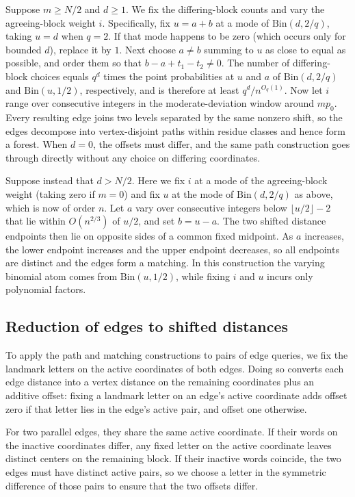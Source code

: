 Suppose $m\ge N/2$ and $d\ge1$. We fix the differing-block counts and vary the agreeing-block weight $i$. Specifically, fix $u=a+b$ at a mode of $\mathrm{Bin}(d,2/q)$, taking $u=d$ when $q=2$. If that mode happens to be zero (which occurs only for bounded $d$), replace it by $1$. Next choose $a\ne b$ summing to $u$ as close to equal as possible, and order them so that $b-a+t_1-t_2\ne0$. The number of differing-block choices equals $q^d$ times the point probabilities at $u$ and $a$ of $\mathrm{Bin}(d,2/q)$ and $\mathrm{Bin}(u,1/2)$, respectively, and is therefore at least $q^d/n^{O_q(1)}$. Now let $i$ range over consecutive integers in the moderate-deviation window around $mp_0$. Every resulting edge joins two levels separated by the same nonzero shift, so the edges decompose into vertex-disjoint paths within residue classes and hence form a forest. When $d=0$, the offsets must differ, and the same path construction goes through directly without any choice on differing coordinates.

Suppose instead that $d>N/2$. Here we fix $i$ at a mode of the agreeing-block weight (taking zero if $m=0$) and fix $u$ at the mode of $\mathrm{Bin}(d,2/q)$ as above, which is now of order $n$. Let $a$ vary over consecutive integers below $\lfloor u/2\rfloor-2$ that lie within $O(n^{2/3})$ of $u/2$, and set $b=u-a$. The two shifted distance endpoints then lie on opposite sides of a common fixed midpoint. As $a$ increases, the lower endpoint increases and the upper endpoint decreases, so all endpoints are distinct and the edges form a matching. In this construction the varying binomial atom comes from $\mathrm{Bin}(u,1/2)$, while fixing $i$ and $u$ incurs only polynomial factors.

\subsection{Reduction of edges to shifted distances}
To apply the path and matching constructions to pairs of edge queries, we fix the landmark letters on the active coordinates of both edges. Doing so converts each edge distance into a vertex distance on the remaining coordinates plus an additive offset: fixing a landmark letter on an edge's active coordinate adds offset zero if that letter lies in the edge's active pair, and offset one otherwise.

For two parallel edges, they share the same active coordinate. If their words on the inactive coordinates differ, any fixed letter on the active coordinate leaves distinct centers on the remaining block. If their inactive words coincide, the two edges must have distinct active pairs, so we choose a letter in the symmetric difference of those pairs to ensure that the two offsets differ.

